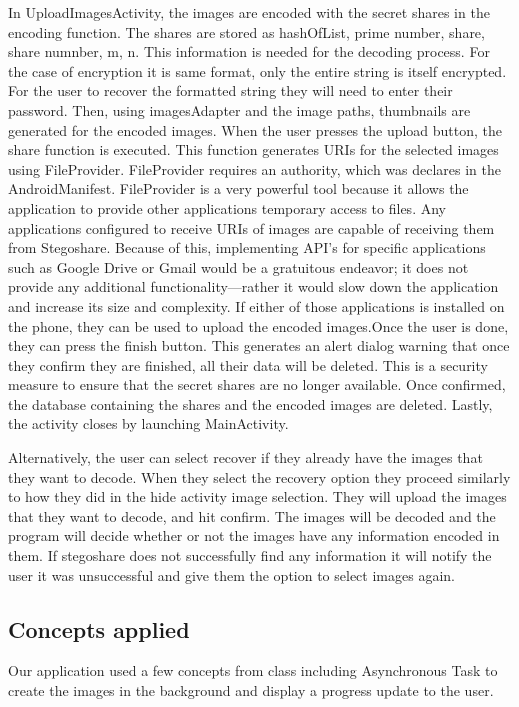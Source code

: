 	In UploadImagesActivity, the images are encoded with the secret shares in the encoding function. The shares are stored as hashOfList, prime number, share, share numnber, m, n. This information is needed for the decoding process. For the case of encryption it is same format, only the entire string
	is itself encrypted. For the user to recover the formatted string they will need to enter their password. Then, using imagesAdapter and the image paths, thumbnails are generated for the encoded images. When the user presses the upload button, the share function is executed. This function generates URIs for the selected images using FileProvider. FileProvider requires an authority, which was declares in the AndroidManifest.
FileProvider is a very powerful tool because it allows the application to provide other applications temporary access to files. Any applications configured to receive URIs of images are capable of receiving them from Stegoshare. Because of this, implementing API’s for specific applications such as Google Drive or Gmail would be a gratuitous endeavor; it does not provide any additional functionality—rather it would slow down the application and increase its size and complexity.
If either of those applications is installed on the phone, they can be used to upload the encoded images.Once the user is done, they can press the finish button. This generates an alert dialog warning that once they confirm they are finished, all their data will be deleted. This is a security measure to ensure that the secret shares are no longer available. Once confirmed, the database containing the shares and the encoded images are deleted. Lastly, the activity closes by launching MainActivity.

Alternatively, the user can select recover if they already have the images that they want to decode. When they select the recovery option they proceed similarly to how they did in the
hide activity image selection. They will upload the images that they want to decode, and hit confirm. The images will be decoded and the program will decide whether or not the images have any
information encoded in them. If stegoshare does not successfully find any information it will notify the user it was unsuccessful and give them the option to select images again.


\subsection{Concepts applied}
Our application used a few concepts from class including Asynchronous Task to create the images in the background and display a progress update to the user.


